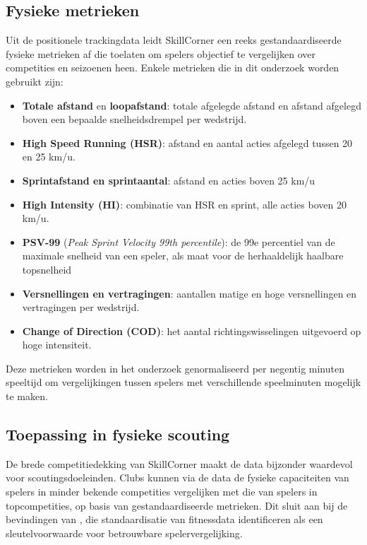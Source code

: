 \subsection{Fysieke metrieken}
 
Uit de positionele trackingdata leidt SkillCorner een reeks gestandaardiseerde fysieke metrieken af die toelaten om spelers objectief te vergelijken over competities en seizoenen heen. Enkele metrieken die in dit onderzoek worden gebruikt zijn:
 
\begin{itemize}
    \item \textbf{Totale afstand} en \textbf{loopafstand}: totale afgelegde afstand en afstand afgelegd boven een bepaalde snelheidsdrempel per wedstrijd.
    \item \textbf{High Speed Running (HSR)}: afstand en aantal acties afgelegd tussen 20 en 25 km/u.
    \item \textbf{Sprintafstand en sprintaantal}: afstand en acties boven 25 km/u
    \item \textbf{High Intensity (HI)}: combinatie van HSR en sprint, alle acties boven 20 km/u.
    \item \textbf{PSV-99} (\textit{Peak Sprint Velocity 99th percentile}): de 99e percentiel van de maximale snelheid van een speler, als maat voor de herhaaldelijk haalbare topsnelheid
    \item \textbf{Versnellingen en vertragingen}: aantallen matige en hoge versnellingen en vertragingen per wedstrijd.
    \item \textbf{Change of Direction (COD)}: het aantal richtingswisselingen uitgevoerd op hoge intensiteit.
\end{itemize}
 
Deze metrieken worden in het onderzoek genormaliseerd per negentig minuten speeltijd om vergelijkingen tussen spelers met verschillende speelminuten mogelijk te maken.
 
\subsection{Toepassing in fysieke scouting}
 
De brede competitiedekking van SkillCorner maakt de data bijzonder waardevol voor scoutingsdoeleinden. Clubs kunnen via de data de fysieke capaciteiten van spelers in minder bekende competities vergelijken met die van spelers in topcompetities, op basis van gestandaardiseerde metrieken. Dit sluit aan bij de bevindingen van \textcite{yunus-2024}, die standaardisatie van fitnessdata identificeren als een sleutelvoorwaarde voor betrouwbare spelervergelijking.
 
